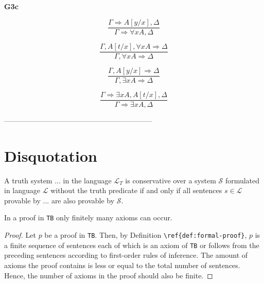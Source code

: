 \begin{definition}
\begin{multicols}{2}
\end{multicols}

\begin{center}
    \textbf{G3c}
\end{center}
\begin{multicols}{2}

\[
\frac{\Gamma \Rightarrow A[y/x], \Delta}{\Gamma \Rightarrow \forall x A, \Delta}\tag{$R\forall$}
\]

\[
\frac{\Gamma, A[t/x], \forall x A \Rightarrow \Delta}{\Gamma, \forall x A \Rightarrow \Delta}\tag{$L\forall$}
\]

\[
\frac{\Gamma, A[y/x] \Rightarrow \Delta}{\Gamma, \exists x A \Rightarrow \Delta}\tag{$L\exists$}
\]

\[
\frac{\Gamma \Rightarrow \exists x A, A[t/x], \Delta}{\Gamma \Rightarrow \exists x A, \Delta}\tag{$R\exists$}
\]

\end{multicols}

\end{definition}

--------------------------------------------------------------

\section{Disquotation}\label{subsec:disquotation}
\begin{definition}[conservativity]
    A truth system $...$  in the language $\mathcal{L}_T$ is conservative over a system $\mathcal{S}$ formulated in language $\mathcal{L}$ without the truth predicate if and only if all sentences $s \in \mathcal{L}$ provable by $...$ are also provable by $\mathcal{S}$.
\end{definition}

\begin{lemma}
    In a proof in \texttt{TB} only finitely many axioms can occur.
\end{lemma}

\begin{proof}
    Let $p$ be a proof in \texttt{TB}. Then, by Definition \verb|\ref{def:formal-proof}|, $p$ is a finite sequence of sentences each of which is an axiom of \texttt{TB} or follows from the preceding sentences according to first-order rules of inference. The amount of axioms the proof contains is less or equal to the total number of sentences. Hence, the number of axioms in the proof should also be finite. 
\end{proof}

